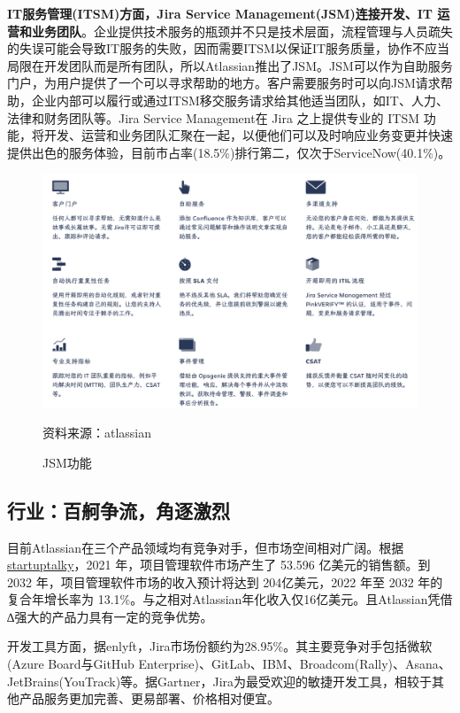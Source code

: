 \textbf{IT服务管理(ITSM)方面，Jira Service Management(JSM)连接开发、IT 运营和业务团队}。企业提供技术服务的瓶颈并不只是技术层面，流程管理与人员疏失的失误可能会导致IT服务的失败，因而需要ITSM以保证IT服务质量，协作不应当局限在开发团队而是所有团队，所以Atlassian推出了JSM。JSM可以作为自助服务门户，为用户提供了一个可以寻求帮助的地方。客户需要服务时可以向JSM请求帮助，企业内部可以履行或通过ITSM移交服务请求给其他适当团队，如IT、人力、法律和财务团队等。Jira Service Management在 Jira 之上提供专业的 ITSM 功能，将开发、运营和业务团队汇聚在一起，以便他们可以及时响应业务变更并快速提供出色的服务体验，目前市占率(18.5\%)排行第二，仅次于ServiceNow(40.1\%)。
\begin{figure}[H]
    \caption{JSM功能}
    \begin{center}
        \includegraphics[width=0.9\linewidth]{img/ITSM.png}
    \end{center}
    \footnotesize{资料来源：atlassian}
\end{figure}

\subsection{行业：百舸争流，角逐激烈}

目前Atlassian在三个产品领域均有竞争对手，但市场空间相对广阔。根据\href{https://startuptalky.com/atlassian-success-story/}{startuptalky}，2021 年，项目管理软件市场产生了 53.596 亿美元的销售额。到 2032 年，项目管理软件市场的收入预计将达到 204亿美元，2022 年至 2032 年的复合年增长率为 13.1\%。与之相对Atlassian年化收入仅16亿美元。且Atlassian凭借∆强大的产品力具有一定的竞争优势。

开发工具方面，据enlyft，Jira市场份额约为28.95\%。其主要竞争对手包括微软(Azure Board与GitHub Enterprise)、GitLab、IBM、Broadcom(Rally)、Asana、JetBrains(YouTrack)等。据Gartner，Jira为最受欢迎的敏捷开发工具，相较于其他产品服务更加完善、更易部署、价格相对便宜。

